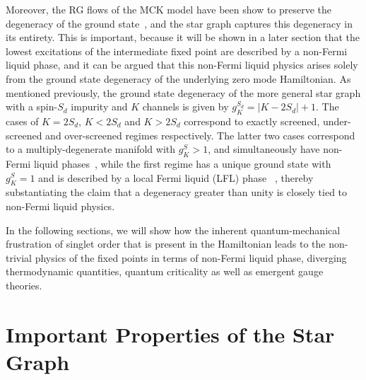 \documentclass[reprint,prb,superscriptaddress]{revtex4-2}
\begin{document}
Moreover, the RG flows of the MCK model have been show to {preserve the degeneracy of the ground state}~\cite{pang_cox_1991,kroha_kolf_2007,zitko_fabrizio_2017}, and the star graph captures this degeneracy in its entirety.
This is important, because it will be shown in a later section that the lowest excitations of the intermediate fixed point are described by a non-Fermi liquid phase, and it can be argued that this non-Fermi liquid physics arises solely from the ground state degeneracy of the underlying zero mode Hamiltonian. As mentioned previously, the ground state degeneracy of the more general star graph with a spin-\({S_d}\) impurity and \(K\) channels is given by \(g^{S_d}_K = |K - 2{S_d}|+1\).
The cases of \(K=2{S_d}\), \(K<2{S_d}\) and \(K>2{S_d}\) correspond to exactly screened, under-screened and over-screened regimes respectively. The latter two cases correspond to a multiply-degenerate manifold with \(g^S_K > 1\), and simultaneously have non-Fermi liquid phases~\cite{Noz_blandin_1980,Gan_Andrei_Coleman_1993,emery_kivelson,Gan_mchannel_1994,
Tsvelick_Weigmann_mchannel_1984,Tsvelick_weigmann_mchannel_1985,parcollet_olivier_large_N,
kimura_taro_Su_N_kondo,PhysRevB.73.224445,cox_jarrell_two_channel_rev,affleck_1991_overscreen,
Coleman_tsvelik,affleck1993exact,coleman_pepin_2003,roch_nicolas_costi_2009,schiller_avraham_2008,
Durganandini_2011}, while the first regime has a unique ground state with \(g^S_K = 1\) and is 
described by a local Fermi liquid (LFL) phase ~\cite{wilson1975,nozieres1974fermi,Noz_blandin_1980,andreiKondoreview,tsvelickKondoreview}, thereby substantiating the claim that a degeneracy greater than unity is closely tied to non-Fermi liquid physics.


In the following sections, we will show how the inherent quantum-mechanical frustration of singlet order that is present in the Hamiltonian leads to the non-trivial physics of the fixed points in terms of non-Fermi liquid phase, diverging thermodynamic quantities, quantum criticality as well as emergent gauge theories.
\section{Important Properties of the Star Graph}
\label{sec:props_star}
\end{document}
